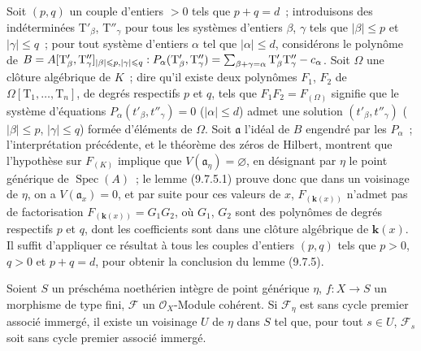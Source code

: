 
Soit $(p,q)$ un couple d'entiers $>0$ tels que $p+q=d$~; introduisons des
indéterminées $\mathrm T'_\beta$, $\mathrm T''_\gamma$ pour tous les systèmes
d'entiers $\beta$, $\gamma$ tels que $|\beta|\leqslant p$ et
$|\gamma|\leqslant q$~; pour tout système d'entiers $\alpha$ tel que
$|\alpha|\leqslant d$, considérons le polynôme de
$B=A[\mathrm T'_\beta,\mathrm T''_\gamma]_{|\beta|\leqslant p,
  |\gamma|\leqslant q}:
P_\alpha(\mathrm T'_\beta,\mathrm T''_\gamma)
=\sum_{\beta+\gamma=\alpha}\mathrm T'_\beta\mathrm T''_\gamma- c_\alpha$.
Soit $\Omega$ une clôture algébrique de $K$~; dire qu'il existe deux polynômes
$F_1$, $F_2$ de $\Omega[\mathrm T_1,\ldots,\mathrm T_n]$, de degrés respectifs
$p$ et $q$, tels que $F_1F_2=F_{(\Omega)}$ signifie que le système d'équations
$P_\alpha(t'_\beta,t''_\gamma)=0$ ($|\alpha|\leqslant d$) admet une solution
$(t'_\beta,t''_\gamma)$ ($|\beta|\leqslant p$, $|\gamma|\leqslant q$) formée
d'éléments de $\Omega$. Soit $\mathfrak a$ l'idéal de $B$ engendré par les
$P_\alpha$~; l'interprétation précédente, et le théorème des zéros de Hilbert,
montrent que l'hypothèse sur $F_{(K)}$ implique que
$V(\mathfrak a_\eta)=\varnothing$, en désignant par $\eta$ le point générique de
$\operatorname{Spec}(A)$~; le lemme (9.7.5.1) prouve donc que dans un voisinage
de $\eta$, on a $V(\mathfrak a_x)=0$, et par suite pour ces valeurs de $x$,
$F_{(\mathbf{k}(x))}$ n'admet pas de factorisation
$F_{(\mathbf{k}(x))}=G_1G_2$, où $G_1$, $G_2$ sont des polynômes de degrés
respectifs $p$ et $q$, dont les coefficients sont dans une clôture algébrique
de $\boldsymbol{k}(x)$. Il suffit d'appliquer ce résultat à tous les couples
d'entiers $(p,q)$ tels que $p>0$, $q>0$ et $p+q=d$, pour obtenir la conclusion
du lemme (9.7.5).

\begin{proposition}[9.7.6]
\label{IV.9.7.6-fr}
Soient $S$ un préschéma noethérien intègre de point générique $\eta$, $f:X\to S$
un morphisme de type fini, $\mathcal F$ un $\mathcal O_X$-Module cohérent. Si
$\mathcal F_\eta$ est sans cycle premier associé immergé, il existe un voisinage
$U$ de $\eta$ dans $S$ tel que, pour tout $s\in U$, $\mathcal F_s$ soit sans cycle
premier associé immergé.
\end{proposition}

